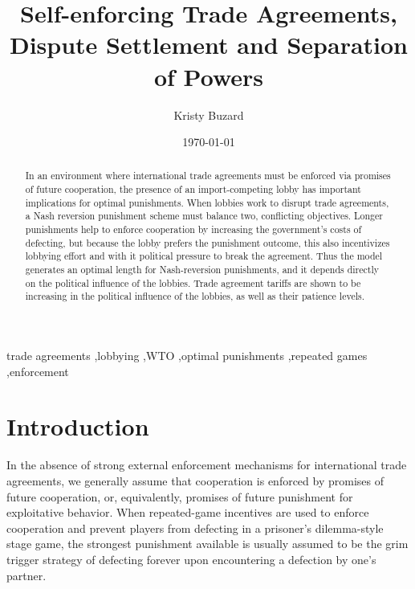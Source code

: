\documentclass[authoryear, review]{elsarticle}
\begin{document}
\title{Self-enforcing Trade Agreements, Dispute Settlement and Separation of Powers}
\author{Kristy Buzard}
\address{110 Eggers Hall, Economics Department, Syracuse University, Syracuse, NY 13244. 315-443-4079.}
\date{\today}

\begin{abstract}
In an environment where international trade agreements must be enforced via promises of future cooperation, the presence of an import-competing lobby has important implications for optimal punishments. When lobbies work to disrupt trade agreements, a Nash reversion punishment scheme must balance two, conflicting objectives. Longer punishments help to enforce cooperation by increasing the government's costs of defecting, but because the lobby prefers the punishment outcome, this also incentivizes lobbying effort and with it political pressure to break the agreement. Thus the model generates an optimal length for Nash-reversion punishments, and it depends directly on the political influence of the lobbies. Trade agreement tariffs are shown to be increasing in the political influence of the lobbies, as well as their patience levels.
\end{abstract}

\begin{keyword}

trade agreements \sep lobbying \sep WTO \sep optimal punishments \sep repeated games \sep enforcement

\end{keyword}

\maketitle

\section{Introduction}
\label{sec:intro}
In the absence of strong external enforcement mechanisms for international trade agreements, we generally assume that cooperation is enforced by promises of future cooperation, or, equivalently, promises of future punishment for exploitative behavior. When repeated-game incentives are used to enforce cooperation and prevent players from defecting in a prisoner's dilemma-style stage game, the strongest punishment available is usually assumed to be the grim trigger strategy of defecting forever upon encountering a defection by one's partner.
\end{document}
